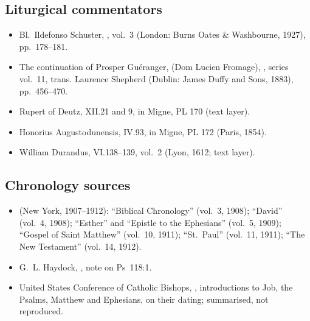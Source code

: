 {\subsection*{Liturgical commentators}
\begin{itemize}\setlength{\itemsep}{0.15em}\setlength{\parskip}{0pt}
\item Bl.\ Ildefonso Schuster, , vol.~3 (London: Burns Oates \& Washbourne, 1927), pp.~178--181.
\item The continuation of Prosper Gu\'eranger,  (Dom Lucien Fromage), , series vol.~11, trans. Laurence Shepherd (Dublin: James Duffy and Sons, 1883), pp.~456--470.
\item Rupert of Deutz,  XII.21 and  9, in Migne, PL 170 (text layer).
\item Honorius Augustodunensis,  IV.93, in Migne, PL 172 (Paris, 1854).
\item William Durandus,  VI.138--139, vol.~2 (Lyon, 1612; text layer).
\end{itemize}

\subsection*{Chronology sources}
\begin{itemize}\setlength{\itemsep}{0.15em}\setlength{\parskip}{0pt}
\item {} (New York, 1907--1912): ``Biblical Chronology'' (vol.~3, 1908); ``David'' (vol.~4, 1908); ``Esther'' and ``Epistle to the Ephesians'' (vol.~5, 1909); ``Gospel of Saint Matthew'' (vol.~10, 1911); ``St.\ Paul'' (vol.~11, 1911); ``The New Testament'' (vol.~14, 1912).
\item G.~L. Haydock, , note on Ps~118:1.
\item United States Conference of Catholic Bishops, , introductions to Job, the Psalms, Matthew and Ephesians, on their dating; summarised, not reproduced.
\end{itemize}
\par}

